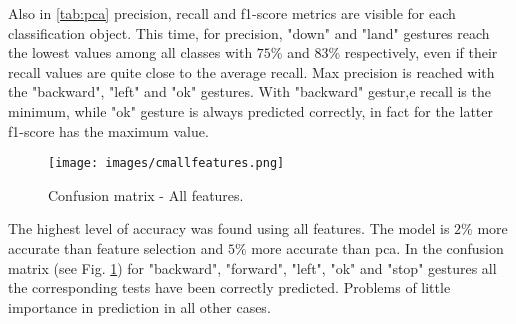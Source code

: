 \noindent Also in \ref{tab:pca} precision, recall and f1-score metrics are visible for each classification object. This time, for precision, "down" and "land" gestures reach the lowest values among all classes with $75\%$ and $83\%$ respectively, even if their recall values are quite close to the average recall. Max precision is reached with the "backward", "left" and "ok" gestures. With "backward" gestur,e recall is the minimum, while "ok" gesture is always predicted correctly, in fact for the latter f1-score has the maximum value.

\begin{figure}[H]
	\centering
	\texttt{[image: images/cmallfeatures.png]}
	\caption[Confusion matrix - All features.]{Confusion matrix - All features.}
	\label{fig:confallfeatures}
\end{figure}

\noindent The highest level of accuracy was found using all features. The model is $2\%$ more accurate than feature selection and $5\%$ more accurate than \gls{pca}. In the confusion matrix (see Fig. \ref{fig:confallfeatures}) for "backward", "forward", "left", "ok" and "stop" gestures all the corresponding tests have been correctly predicted. Problems of little importance in prediction in all other cases.

